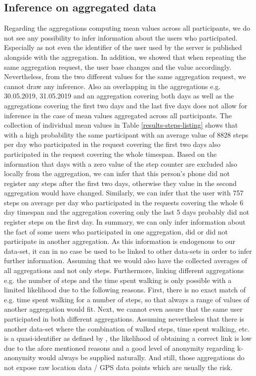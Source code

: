 \subsection{Inference on aggregated data}\label{inference}
Regarding the aggregations computing mean values across all participants, we do not see any possibility to infer information about the users who participated. Especially as not even the identifier of the user used by the server is published alongside with the aggregation. In addition, we showed that when repeating the same aggregation request, the user base changes and the value accordingly. Nevertheless, from the two different values for the same aggregation request, we cannot draw any inference. Also an overlapping in the aggregations e.g. 30.05.2019, 31.05.2019 and an aggregation covering both days as well as the aggregations covering the first two days and the last five days does not allow for inference in the case of mean values aggregated across all participants.
The collection of individual mean values in Table \ref{results-steps-listing} shows that with a high probability the same participant with an average value of 8828 steps per day who participated in the request covering the first two days also participated in the request covering the whole timespan. Based on the information that days with a zero value of the step counter are excluded also locally from the aggregation, we can infer that this person's phone did not register any steps after the first two days, otherwise they value in the second aggregation would have changed. Similarly, we can infer that the user with 757 steps on average per day who participated in the requests covering the whole 6 day timespan and the aggregation covering only the last 5 days probably did not register steps on the first day.
In summary, we can only infer information about the fact of some users who participated in one aggregation, did or did not participate in another aggregation. As this information is endogenous to our data-set, it can in no case be used to be linked to other data-sets in order to infer further information.
Assuming that we would also have the collected averages of all aggregations and not only steps.
Furthermore, linking different aggregations e.g. the number of steps and the time spent walking is only possible with a limited likelihood due to the following reasons. First, there is no exact match of e.g. time spent walking for a number of steps, so that always a range of values of another aggregation would fit. Next, we cannot even assure that the same user participated in both different aggregations. Assuming nevertheless that there is another data-set where the combination of walked steps, time spent walking, etc. is a quasi-identifier as defined by \parencite{k-anonymity-achieving}, the likelihood of obtaining a correct link is low due to the afore mentioned reasons and a good level of anonymity regarding k-anonymity would always be supplied naturally. And still, those aggregations do not expose raw location data / GPS data points which are usually the risk.

